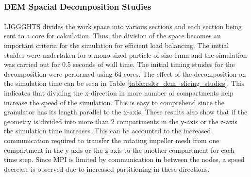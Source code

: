 \documentclass[preprint,11pt,authoryear]{elsarticle}
\begin{document}
	    \subsubsection{DEM Spacial Decomposition Studies}
	    \par LIGGGHTS\textsuperscript{\textregistered} divides the work space into various sections and each section being sent to a core for calculation. Thus, the division of the space becomes an important criteria for the simulation for efficient load balancing. The initial stuides were undertaken for a mono-sized particle of size 1mm and the simulation was carried out for 0.5 seconds of wall time. The initial timing stuides for the decomposition were performed using 64 cores. The effect of the decomposition on the simulation time can be seen in Table \ref{table:rslts_dem_slicing_studies}. This indicates that dividing the x-direction in more number of compartments help increase the speed of the simulation. This is easy to comprehend since the granulator has its length parallel to the x-axis. These results also show that if the geometry is divided into more than 2 compartments in the y-axis or the z-axis the simulation time increases. This can be accounted to the increased communication required to transfer the rotating impeller mesh from one compartment in the y-axis or the z-axis to the another compartment for each time step. Since MPI is limited by communication in between the nodes, a speed decrease is observed due to increased partitioning in these directions.
	    
	      \begin{table}[ht]
	      \caption{The effect of spatial decomposition on the performance of the DEM simulations}
		  \label{table:rslts_dem_slicing_studies}
		  \begin{center}

\end{center}		  	      
	      \end{table}
	      
\end{document}
